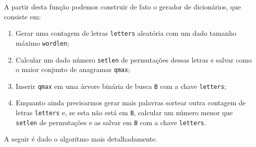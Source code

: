 \documentclass[a4paper]{article}
\newcommand{\ttt}{\texttt}
\begin{document}
    A partir desta função podemos construir de fato o gerador de dicionários, que consiste em:
    \begin{enumerate}
        \item Gerar uma contagem de letras \ttt{letters} aleatória com um dado tamanho máximo \ttt{wordlen};
        \item Calcular um dado número \ttt{setlen} de permutações dessas letras e salvar como o maior conjunto de anagramas \ttt{qmax};
        \item Inserir \ttt{qmax} em uma árvore binária de busca \ttt{B} com a chave \ttt{letters};
        \item Enquanto ainda precisarmos gerar mais palavras sortear outra contagem de letras \ttt{letters} e, se esta não está em \ttt{B}, calcular um número menor que \ttt{setlen} de permutações e as salvar em \ttt{B} com a chave \ttt{letters}.
    \end{enumerate}

    A seguir é dado o algoritmo mais detalhadamente.
\end{document}
